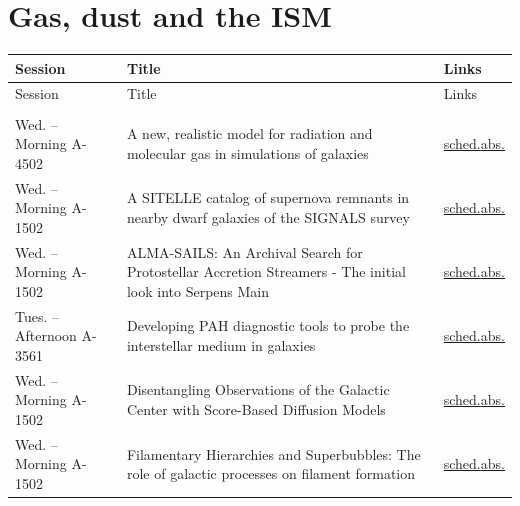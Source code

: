 \section*{Gas, dust and the ISM}
{\small
\setlength{\emergencystretch}{1em}
\begin{longtable}{@{}>{\TableRaggedRight\arraybackslash\hspace{0pt}}p{} >{\TableRaggedRight\arraybackslash\hspace{0pt}}p{} >{\TableRaggedRight\arraybackslash\hspace{0pt}}p{}@{}}
\toprule
Session & Title & Links \\
\midrule
\endfirsthead
\toprule
Session & Title & Links \\
\midrule
\endhead
\addlinespace[0.15em]
\multicolumn{3}{@{}l}{\sffamily\bfseries\color{cascateal} Talks} \\
\addlinespace[0.1em]
Wed. -- Morning A-4502 & A new, realistic model for radiation and molecular gas in simulations of galaxies & \hyperlink{schedule-talk-187}{sched.}\newline \hyperlink{abstract-talk-187}{abs.} \\
Wed. -- Morning A-1502 & A SITELLE catalog of supernova remnants in nearby dwarf galaxies of the SIGNALS survey & \hyperlink{schedule-talk-101}{sched.}\newline \hyperlink{abstract-talk-101}{abs.} \\
Wed. -- Morning A-1502 & ALMA-SAILS: An Archival Search for Protostellar Accretion Streamers - The initial look into Serpens Main & \hyperlink{schedule-talk-328}{sched.}\newline \hyperlink{abstract-talk-328}{abs.} \\
Tues. -- Afternoon A-3561 & Developing PAH diagnostic tools to probe the interstellar medium in galaxies & \hyperlink{schedule-talk-289}{sched.}\newline \hyperlink{abstract-talk-289}{abs.} \\
Wed. -- Morning A-1502 & Disentangling Observations of the Galactic Center with Score-Based Diffusion Models & \hyperlink{schedule-talk-124}{sched.}\newline \hyperlink{abstract-talk-124}{abs.} \\
Wed. -- Morning A-1502 & Filamentary Hierarchies and Superbubbles: The role of galactic processes on filament formation & \hyperlink{schedule-talk-6}{sched.}\newline \hyperlink{abstract-talk-6}{abs.} \\

\end{longtable}}
